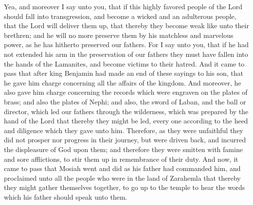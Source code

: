 Yea, and moreover I say unto you, that if this highly favored people of the Lord should fall into transgression, and become a wicked and an adulterous people, that the Lord will deliver them up, that thereby they become weak like unto their brethren; and he will no more preserve them by his matchless and marvelous power, as he has hitherto preserved our fathers.
\bverse \iffalse For I say unto you, that if he had not extended his arm in the preservation of our fathers they must have fallen into the hands of the Lamanites, and become victims to their hatred. \fi
For I say unto you, that if he had not extended his arm in the preservation of our fathers they must have fallen into the hands of the Lamanites, and become victims to their hatred.
\bverse \iffalse And it came to pass that after king Benjamin had made an end of these sayings to his son, that he gave him charge concerning all the affairs of the kingdom. \fi
And it came to pass that after king Benjamin had made an end of these sayings to his son, that he gave him charge concerning all the affairs of the kingdom.
\bverse \iffalse And moreover, he also gave him charge concerning the records which were engraven on the plates of brass; and also the plates of Nephi; and also, the sword of Laban, and the ball or director, which led our fathers through the wilderness, which was prepared by the hand of the Lord that thereby they might be led, every one according to the heed and diligence which they gave unto him. \fi
And moreover, he also gave him charge concerning the records which were engraven on the plates of brass; and also the plates of Nephi; and also, the sword of Laban, and the ball or director, which led our fathers through the wilderness, which was prepared by the hand of the Lord that thereby they might be led, every one according to the heed and diligence which they gave unto him.
\bverse \iffalse Therefore, as they were unfaithful they did not prosper nor progress in their journey, but were driven back, and incurred the displeasure of God upon them; and therefore they were smitten with famine and sore afflictions, to stir them up in remembrance of their duty. \fi
Therefore, as they were unfaithful they did not prosper nor progress in their journey, but were driven back, and incurred the displeasure of God upon them; and therefore they were smitten with famine and sore afflictions, to stir them up in remembrance of their duty.
\bverse \iffalse And now, it came to pass that Mosiah went and did as his father had commanded him, and proclaimed unto all the people who were in the land of Zarahemla that thereby they might gather themselves together, to go up to the temple to hear the words which his father should speak unto them. \fi
And now, it came to pass that Mosiah went and did as his father had commanded him, and proclaimed unto all the people who were in the land of Zarahemla that thereby they might gather themselves together, to go up to the temple to hear the words which his father should speak unto them.



